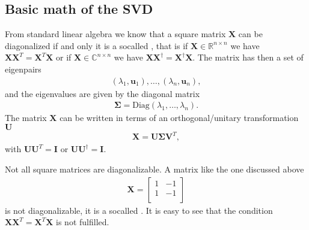 \documentclass[letterpaper,10pt,english]{sphinxmanual}
\begin{document}
\subsection{Basic math of the SVD}
\label{\detokenize{chapter4:basic-math-of-the-svd}}
From standard linear algebra we know that a square matrix \(\boldsymbol{X}\) can be diagonalized if and only it is
a so\sphinxhyphen{}called , that is if \(\boldsymbol{X}\in {\mathbb{R}}^{n\times n}\)
we have \(\boldsymbol{X}\boldsymbol{X}^T=\boldsymbol{X}^T\boldsymbol{X}\) or if \(\boldsymbol{X}\in {\mathbb{C}}^{n\times n}\) we have \(\boldsymbol{X}\boldsymbol{X}^{\dagger}=\boldsymbol{X}^{\dagger}\boldsymbol{X}\).
The matrix has then a set of eigenpairs
\begin{equation*}
\begin{split}
(\lambda_1,\boldsymbol{u}_1),\dots, (\lambda_n,\boldsymbol{u}_n),
\end{split}
\end{equation*}
and the eigenvalues are given by the diagonal matrix
\begin{equation*}
\begin{split}
\boldsymbol{\Sigma}=\mathrm{Diag}(\lambda_1, \dots,\lambda_n).
\end{split}
\end{equation*}
The matrix \(\boldsymbol{X}\) can be written in terms of an orthogonal/unitary transformation \(\boldsymbol{U}\)
\begin{equation*}
\begin{split}
\boldsymbol{X} = \boldsymbol{U}\boldsymbol{\Sigma}\boldsymbol{V}^T,
\end{split}
\end{equation*}
with \(\boldsymbol{U}\boldsymbol{U}^T=\boldsymbol{I}\) or \(\boldsymbol{U}\boldsymbol{U}^{\dagger}=\boldsymbol{I}\).

Not all square matrices are diagonalizable. A matrix like the one discussed above
\begin{equation*}
\begin{split}
\boldsymbol{X} = \begin{bmatrix} 
1&  -1 \\
1& -1\\
\end{bmatrix}
\end{split}
\end{equation*}
is not diagonalizable, it is a so\sphinxhyphen{}called . It is easy to see that the condition
\(\boldsymbol{X}\boldsymbol{X}^T=\boldsymbol{X}^T\boldsymbol{X}\) is not fulfilled.
\end{document}
